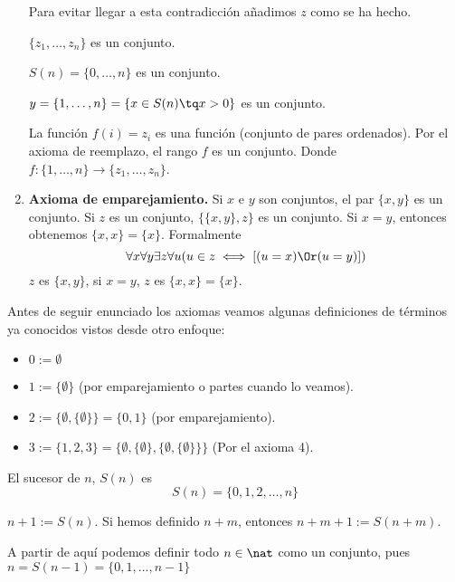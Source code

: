 \begin{enumerate}
		Para evitar llegar a esta contradicción añadimos $z$ como se ha hecho.
		
		\begin{obs}

			$\{z_1,\hdots, z_n\}$ es un conjunto.
			
			$S(n) = \{0, \hdots, n\}$ es un conjunto.
			
			$y=\{1, \hdots, n\} = \{x\in S(n)\tq x>0\}$ es un conjunto.
			
			La función $f(i) = z_i$ es una función (conjunto de pares ordenados). Por el axioma de reemplazo, el rango $f$ es un conjunto. Donde $f:\{1,\hdots, n\}\to \{z_1, \hdots, z_n\}$.
		\end{obs}
		
		\item \textbf{Axioma de emparejamiento.} Si $x$ e $y$ son conjuntos, el par $\{x, y\}$ es un conjunto. Si $z$ es un conjunto, $\{\{x,y\},z\}$ es un conjunto. Si $x = y$, entonces obtenemos $\{x,x\} = \{x\}$. Formalmente
		$$\forall x\forall y\exists z\forall u(u\in z\iff \left[(u=x)\Or (u=y)\right])$$
		$z$ es $\{x,y\}$, si $x=y$, $z$ es $\{x,x\}=\{x\}$.
	\end{enumerate}
	
	Antes de seguir enunciado los axiomas veamos algunas definiciones de términos ya conocidos vistos desde otro enfoque:
	
	\begin{defn}
	\begin{itemize}
		\item $0:=\emptyset$
		\item $1:=\{\emptyset\}$ (por emparejamiento o partes cuando lo veamos).
		\item $2:=\{\emptyset, \{\emptyset\}\} = \{0,1\}$ (por emparejamiento).
		\item $3:=\{1,2,3\} = \{\emptyset,\{\emptyset\},\{\emptyset, \{\emptyset\}\}\}$ (Por el axioma 4).
	\end{itemize}
	\end{defn}

	\begin{defn}[Sucesor]
		El sucesor de $n$, $S(n)$ es $$S(n) = \{0,1,2,\hdots, n\}$$
	\end{defn}
	
	\begin{defn}
		$n+1 := S(n)$. Si hemos definido $n+m$, entonces
		$n+m+1 := S(n+m)$.
	\end{defn}

	\obs A partir de aquí podemos definir todo $n\in \nat$ como un conjunto, pues $n=S(n-1)=\{0,1,...,n-1\}$
	
